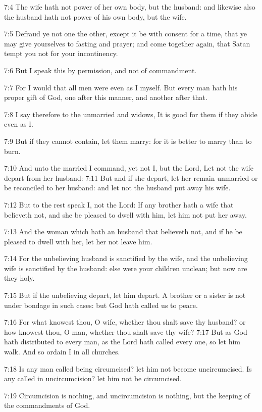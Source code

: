 7:4 The wife hath not power of her own body, but the husband: and likewise also the husband hath not power of his own body, but the wife.

7:5 Defraud ye not one the other, except it be with consent for a time, that ye may give yourselves to fasting and prayer; and come together again, that Satan tempt you not for your incontinency.

7:6 But I speak this by permission, and not of commandment.

7:7 For I would that all men were even as I myself. But every man hath his proper gift of God, one after this manner, and another after that.

7:8 I say therefore to the unmarried and widows, It is good for them if they abide even as I.

7:9 But if they cannot contain, let them marry: for it is better to marry than to burn.

7:10 And unto the married I command, yet not I, but the Lord, Let not the wife depart from her husband: 7:11 But and if she depart, let her remain unmarried or be reconciled to her husband: and let not the husband put away his wife.

7:12 But to the rest speak I, not the Lord: If any brother hath a wife that believeth not, and she be pleased to dwell with him, let him not put her away.

7:13 And the woman which hath an husband that believeth not, and if he be pleased to dwell with her, let her not leave him.

7:14 For the unbelieving husband is sanctified by the wife, and the unbelieving wife is sanctified by the husband: else were your children unclean; but now are they holy.

7:15 But if the unbelieving depart, let him depart. A brother or a sister is not under bondage in such cases: but God hath called us to peace.

7:16 For what knowest thou, O wife, whether thou shalt save thy husband?  or how knowest thou, O man, whether thou shalt save thy wife?  7:17 But as God hath distributed to every man, as the Lord hath called every one, so let him walk. And so ordain I in all churches.

7:18 Is any man called being circumcised? let him not become uncircumcised. Is any called in uncircumcision? let him not be circumcised.

7:19 Circumcision is nothing, and uncircumcision is nothing, but the keeping of the commandments of God.

